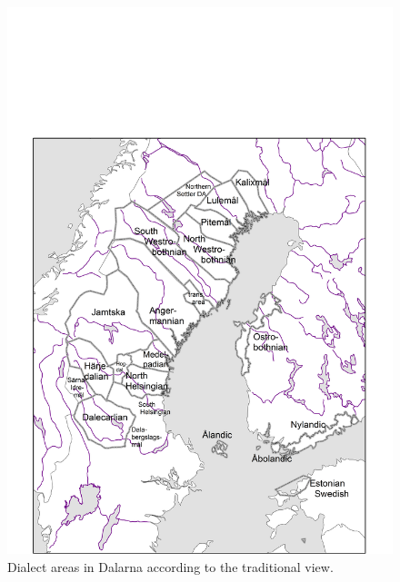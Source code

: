 \begin{figure}[h]

\includegraphics{figures_mod/image6}
\caption{Dialect areas in Dalarna according to the traditional view.}
\label{map:6}

\end{figure}

